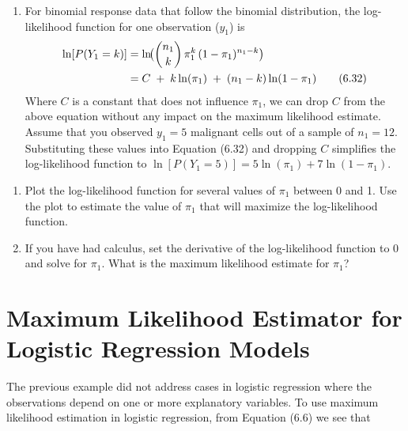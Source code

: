 \documentclass[
]{report}
\providecommand{\tightlist}{%
  \setlength{\itemsep}{0pt}\setlength{\parskip}{0pt}}
\begin{document}
\begin{enumerate}
\def\labelenumi{\arabic{enumi}.}
\setcounter{enumi}{33}
\tightlist
\item
  For binomial response data that follow the binomial distribution, the log-likelihood function for one observation (\(y_1\)) is\\
  \begin{align}
  \ln[P(Y_1 = k)]
  &= \ln\!\bigl(\binom{n_1}{k}\,\pi_1^k\,(1 - \pi_1)^{n_1 - k}\bigr) \notag \\
  &= C \;+\;k\ln(\pi_1)\;+\;(n_1 - k)\ln(1 - \pi_1)
  \tag{6.32}
  \end{align}
  Where \(C\) is a constant that does not influence \(\pi_1\), we can drop \(C\) from the above equation without any impact on the maximum likelihood estimate. Assume that you observed \(y_1 = 5\) malignant cells out of a sample of \(n_1 = 12\). Substituting these values into Equation (6.32) and dropping \(C\) simplifies the log-likelihood function to \(\ln[P(Y_1 = 5)] = 5\ln(\pi_1) + 7\ln(1 - \pi_1).\)
\end{enumerate}

\begin{enumerate}
\def\labelenumi{\alph{enumi}.}
\tightlist
\item
  Plot the log-likelihood function for several values of \(\pi_1\) between 0 and 1. Use the plot to estimate the value of \(\pi_1\) that will maximize the log-likelihood function.\\
\item
  If you have had calculus, set the derivative of the log-likelihood function to 0 and solve for \(\pi_1\). What is the maximum likelihood estimate for \(\pi_1\)?
\end{enumerate}

\hypertarget{maximum-likelihood-estimator-for-logistic-regression-models}{%
\section*{Maximum Likelihood Estimator for Logistic Regression Models}\label{maximum-likelihood-estimator-for-logistic-regression-models}}

The previous example did not address cases in logistic regression where the observations depend on one or more explanatory variables. To use maximum likelihood estimation in logistic regression, from Equation (6.6) we see that
\end{document}
